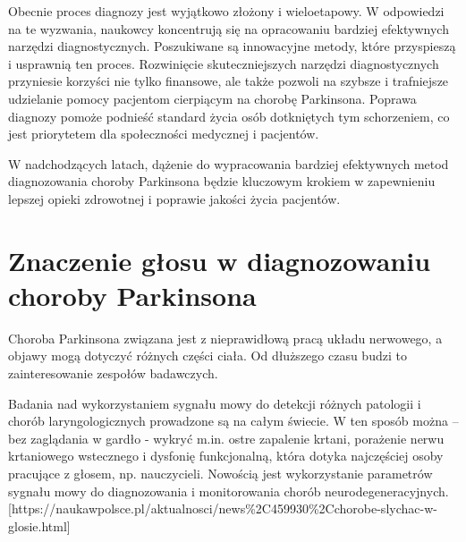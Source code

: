 Obecnie proces diagnozy jest wyjątkowo złożony i wieloetapowy.
W odpowiedzi na te wyzwania, naukowcy koncentrują się na opracowaniu bardziej efektywnych narzędzi diagnostycznych.
Poszukiwane są innowacyjne metody, które przyspieszą i usprawnią ten proces.
Rozwinięcie skuteczniejszych narzędzi diagnostycznych przyniesie korzyści nie tylko finansowe, ale także pozwoli na szybsze i trafniejsze udzielanie pomocy pacjentom cierpiącym na chorobę Parkinsona.
Poprawa diagnozy pomoże podnieść standard życia osób dotkniętych tym schorzeniem, co jest priorytetem dla społeczności medycznej i pacjentów.

W nadchodzących latach, dążenie do wypracowania bardziej efektywnych metod diagnozowania choroby Parkinsona będzie kluczowym krokiem w zapewnieniu lepszej opieki zdrowotnej i poprawie jakości życia pacjentów.


\section{Znaczenie głosu w diagnozowaniu choroby Parkinsona}
\label{sec:znaczenie_glosu}

Choroba Parkinsona związana jest z nieprawidłową pracą układu nerwowego, a objawy mogą dotyczyć różnych części ciała.
Od dłuższego czasu budzi to zainteresowanie zespołów badawczych.


Badania nad wykorzystaniem sygnału mowy do detekcji różnych patologii i chorób laryngologicznych prowadzone są na całym świecie.
W ten sposób można – bez zaglądania w gardło - wykryć m.in. ostre zapalenie krtani, porażenie nerwu krtaniowego wstecznego i dysfonię
funkcjonalną, która dotyka najczęściej osoby pracujące z głosem, np. nauczycieli.
Nowością jest wykorzystanie parametrów sygnału mowy do diagnozowania i monitorowania chorób neurodegeneracyjnych.
[https://naukawpolsce.pl/aktualnosci/news\%2C459930\%2Cchorobe-slychac-w-glosie.html]

